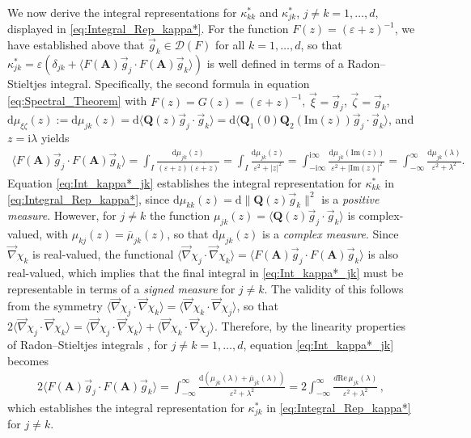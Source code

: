 \documentclass[11pt]{amsart}
\newcommand{\I}{\mathrm{i}}
\renewcommand{\d}{\mathrm{d}}
\newcommand{\Ab}{\mathbf{A}}
\newcommand{\Qb}{\mathbf{Q}}
\newcommand{\Ds}{\mathscr{D}}
\begin{document}
We now derive the integral representations for $\kappa^*_{kk}$ and
$\kappa^*_{jk}$, $j\neq k=1,\ldots,d$, displayed in
\eqref{eq:Integral_Rep_kappa*}. For the function $F(z)=(\varepsilon+z)^{-1}$, we
have established above that $\vec{g}_k\in\Ds(F)$ for all
$k=1,\ldots,d$, so that
$\kappa^*_{jk}=\varepsilon(\delta_{jk}+\langle F(\Ab)\vec{g}_j\cdot F(\Ab)\vec{g}_k\rangle)$ is well defined
in terms of a Radon--Stieltjes integral. Specifically, the second
formula in equation \eqref{eq:Spectral_Theorem} with
$F(z)=G(z)=(\varepsilon+z)^{-1}$, $\vec{\xi}=\vec{g}_j$, $\vec{\zeta}=\vec{g}_k$,
$\d\mu_{\xi\zeta}(z):=\d\mu_{jk}(z)=\d\langle\Qb(z)\vec{g}_j\cdot\vec{g}_k\rangle
=\d\langle\Qb_1(0)\Qb_2(\text{Im}(z))\vec{g}_j\cdot\vec{g}_k\rangle$, and $z=\I\lambda$
yields         
%
\begin{align}\label{eq:Int_kappa*_jk}
  \langle F(\Ab)\vec{g}_j\cdot F(\Ab)\vec{g}_k\rangle
               =\int_I\frac{\d\mu_{jk}(z)}{(\varepsilon+z)\overline{(\varepsilon+z)}}
               =\int_I\frac{\d\mu_{jk}(z)}{\varepsilon^2+|z|^2}
               =\int_{-\I\infty}^{\I\infty}\frac{\d\mu_{jk}(\text{Im}(z))}{\varepsilon^2+|\text{Im}(z)|^2}
               =\int_{-\infty}^\infty\frac{\d\mu_{jk}(\lambda)}{\varepsilon^2+\lambda^2}.
\end{align}
%
Equation \eqref{eq:Int_kappa*_jk} establishes the integral
representation for $\kappa^*_{kk}$ in \eqref{eq:Integral_Rep_kappa*}, since
$\d\mu_{kk}(z)=\d\|\Qb(z)\vec{g}_k\|^2$ is a \emph{positive
  measure}. However, for $j\neq k$ the function
$\mu_{jk}(z)=\langle\Qb(z)\vec{g}_j\cdot\vec{g}_k\rangle$ is complex-valued, with
$\mu_{kj}(z)=\overline{\mu}_{jk}(z)$, so that $\d\mu_{jk}(z)$ is a
\emph{complex measure}. Since $\vec{\nabla}\chi_k$ is real-valued, the
functional $\langle\vec{\nabla}\chi_j\cdot\vec{\nabla}\chi_k\rangle=\langle F(\Ab)\vec{g}_j\cdot F(\Ab)\vec{g}_k\rangle$
is also real-valued, which implies that the final integral in
\eqref{eq:Int_kappa*_jk} must be representable in terms of a
\emph{signed measure} for $j\neq k$. The validity of this follows from the
symmetry $\langle\vec{\nabla}\chi_j\cdot\vec{\nabla}\chi_k\rangle=\langle\vec{\nabla}\chi_k\cdot\vec{\nabla}\chi_j\rangle$, so that
$2\langle\vec{\nabla}\chi_j\cdot\vec{\nabla}\chi_k\rangle=\langle\vec{\nabla}\chi_j\cdot\vec{\nabla}\chi_k\rangle+\langle\vec{\nabla}\chi_k\cdot\vec{\nabla}\chi_j\rangle$. Therefore,
by the linearity properties of Radon--Stieltjes integrals \cite{Stone:64}, for
$j\neq k=1,\ldots,d$, equation \eqref{eq:Int_kappa*_jk} becomes
% 
\begin{align}\label{eq:Int_kappa*_jk_Re}
  2\langle F(\Ab)\vec{g}_j\cdot F(\Ab)\vec{g}_k\rangle
       =\int_{-\infty}^\infty\frac{\d(\mu_{jk}(\lambda)+\overline{\mu}_{jk}(\lambda))}{\varepsilon^2+\lambda^2}
       =2\int_{-\infty}^\infty\frac{d\text{Re}\,\mu_{jk}(\lambda)}{\varepsilon^2+\lambda^2}\,,            
\end{align}
%
which establishes the integral representation for $\kappa^*_{jk}$ in
\eqref{eq:Integral_Rep_kappa*} for $j\neq k$. 
\end{document}
